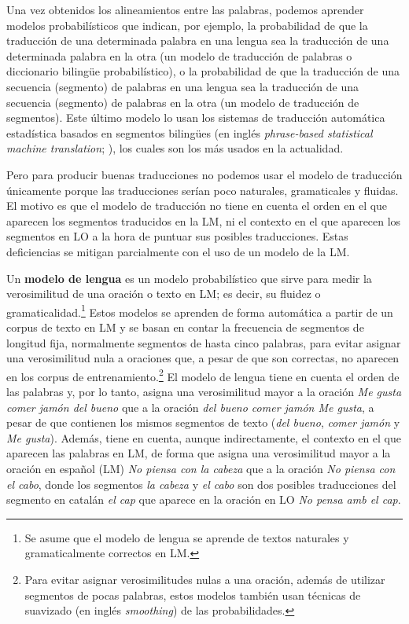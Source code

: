 Una vez obtenidos los alineamientos entre las palabras, podemos aprender modelos probabilísticos que indican, por ejemplo, la probabilidad de que la traducción de una determinada palabra en una lengua sea la traducción de una determinada palabra en la otra (un modelo de traducción de palabras o diccionario bilingüe probabilístico), o la probabilidad de que la traducción de una secuencia (segmento) de palabras en una lengua sea la traducción de una secuencia (segmento) de palabras en la otra (un modelo de traducción de segmentos). Este último modelo lo usan los sistemas de traducción automática estadística basados en segmentos bilingües (en inglés \emph{phrase-based statistical machine translation}; \cite{koehnbook}), los cuales son los más usados en la actualidad. 

Pero para producir buenas traducciones no podemos usar el modelo de traducción únicamente porque las traducciones serían poco naturales, gramaticales y fluidas. El motivo es que el modelo de traducción no tiene en cuenta el orden en el que aparecen los segmentos traducidos en la LM, ni el contexto en el que aparecen los segmentos en LO a la hora de puntuar sus posibles traducciones. Estas deficiencias se mitigan parcialmente con el uso de un modelo de la LM. 

Un \textbf{modelo de lengua} es un modelo probabilístico que sirve para medir la verosimilitud de una oración o texto en LM; es decir, su fluidez o gramaticalidad.\footnote{Se asume que el modelo de lengua se aprende de textos naturales y gramaticalmente correctos en LM.} Estos modelos se aprenden de forma automática a partir de un corpus de texto en LM y se basan en contar la frecuencia de segmentos de longitud fija, normalmente segmentos de hasta cinco palabras, para evitar asignar una verosimilitud nula a oraciones que, a pesar de que son correctas, no aparecen en los corpus de entrenamiento.\footnote{Para evitar asignar verosimilitudes nulas a una oración, además de utilizar segmentos de pocas palabras, estos modelos también usan técnicas de suavizado (en inglés \emph{smoothing}) de las probabilidades.} El modelo de lengua tiene en cuenta el orden de las palabras y, por lo tanto, asigna una verosimilitud mayor a la oración \emph{Me gusta comer jamón del bueno} que a la oración \emph{del bueno comer jamón Me gusta}, a pesar de que contienen los mismos segmentos de texto (\emph{del bueno}, \emph{comer jamón} y \emph{Me gusta}). Además, tiene en cuenta, aunque indirectamente, el contexto en el que aparecen las palabras en LM, de forma que asigna una verosimilitud mayor a la oración en español (LM) \emph{No piensa con la cabeza} que a la oración \emph{No piensa con el cabo}, donde los segmentos \emph{la cabeza} y \emph{el cabo} son dos posibles traducciones del segmento en catalán \emph{el cap} que aparece en la oración en LO \emph{No pensa amb el cap}. 

